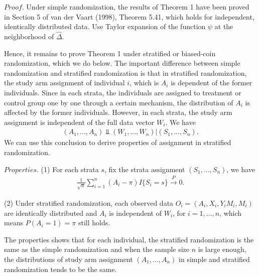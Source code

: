 \documentclass{article}
\begin{document}
$Proof.$ Under simple randomization, the results of Theorem 1 have been proved
in Section 5 of van der Vaart (1998)\cite{van1998asymptotic}, Theorem 5.41, which holds for independent, identically distributed
data. Use Taylor expansion of the function $\psi$ at the neighborhood of $\hat{\Delta}$.

Hence, it remains to prove Theorem 1 under stratified or
biased-coin randomization, which we do below. The important difference between simple randomization and stratified randomization is that in stratified randomization, the study arm assignment of individual $i$, which is $A_i$ is dependent of the former individuals. Since in each strata, the individuals are assigned to treatment or control group one by one through a certain mechanism, the distribution of $A_i$ is affected by the former individuals. However, in each strata, the study arm assignment is independent of the full data vector $W_i$. We have
\begin{align}
    (A_1,...,A_n)\Vbar(W_1,...,W_n)\big|(S_1,...,S_n).
\end{align}
We can use this conclusion to derive properties of assignment in stratified randomization.

$Properties.$ (1) For each strata $s$, fix the strata assignment $(S_1,...,S_n)$, we have 
\begin{align}
    \frac{1}{\sqrt{n}}\sum_{i=1}^n(A_i-\pi)I\{S_i=s\}\stackrel{P}{\rightarrow}0.
\end{align}

(2) Under stratified randomization, each observed data $O_i=(A_i,X_i,Y_i M_i,M_i)$ are identically distributed and $A_i$ is independent of $W_i$, for $i=1,...,n$, which means $P(A_i=1)=\pi$ still holds.

The properties shows that for each individual, the stratified randomization is the same as the simple randomization and when the sample size $n$ is large enough, the distributions of study arm assignment $(A_1,...,A_n)$ in simple and stratified randomization tends to be the same.
\end{document}
